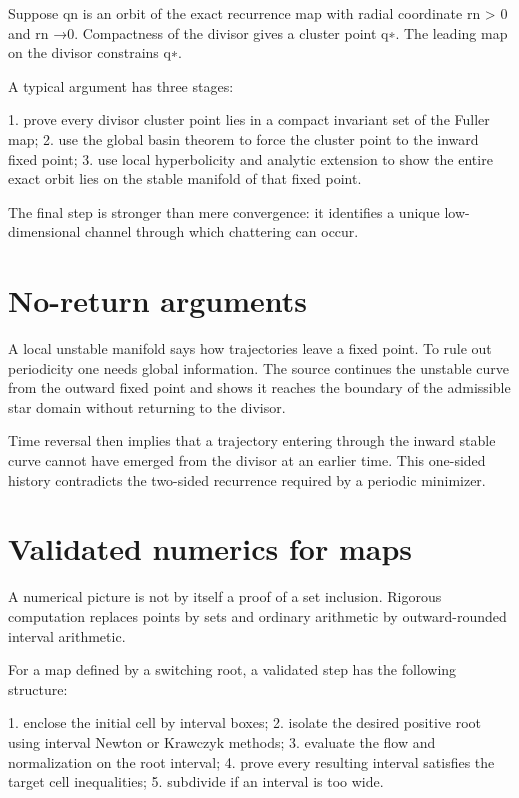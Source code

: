 Suppose qn is an orbit of the exact recurrence map with radial coordinate rn > 0 and rn →0. Compactness of the divisor gives a cluster point q∗. The leading map on the divisor constrains q∗.


A typical argument has three stages:


1. prove every divisor cluster point lies in a compact invariant set of the Fuller map; 2. use the global basin theorem to force the cluster point to the inward fixed point; 3. use local hyperbolicity and analytic extension to show the entire exact orbit lies on the stable manifold of that fixed point.


The final step is stronger than mere convergence: it identifies a unique low-dimensional channel through which chattering can occur.


\section{No-return arguments}

A local unstable manifold says how trajectories leave a fixed point. To rule out periodicity one needs global information. The source continues the unstable curve from the outward fixed point and shows it reaches the boundary of the admissible star domain without returning to the divisor.


Time reversal then implies that a trajectory entering through the inward stable curve cannot have emerged from the divisor at an earlier time. This one-sided history contradicts the two-sided recurrence required by a periodic minimizer.


\section{Validated numerics for maps}

A numerical picture is not by itself a proof of a set inclusion. Rigorous computation replaces points by sets and ordinary arithmetic by outward-rounded interval arithmetic.


For a map defined by a switching root, a validated step has the following structure:


1. enclose the initial cell by interval boxes; 2. isolate the desired positive root using interval Newton or Krawczyk methods; 3. evaluate the flow and normalization on the root interval; 4. prove every resulting interval satisfies the target cell inequalities; 5. subdivide if an interval is too wide.


